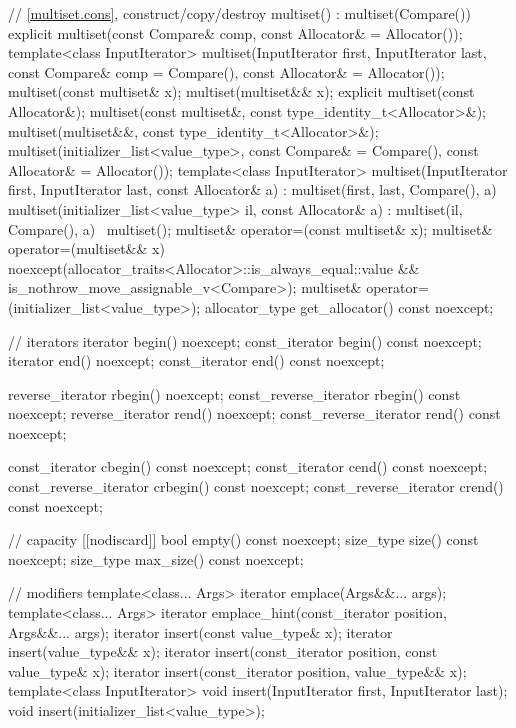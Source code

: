\begin{codeblock}
{{    // \ref{multiset.cons}, construct/copy/destroy
    multiset() : multiset(Compare()) { }
    explicit multiset(const Compare& comp, const Allocator& = Allocator());
    template<class InputIterator>
      multiset(InputIterator first, InputIterator last,
               const Compare& comp = Compare(), const Allocator& = Allocator());
    multiset(const multiset& x);
    multiset(multiset&& x);
    explicit multiset(const Allocator&);
    multiset(const multiset&, const type_identity_t<Allocator>&);
    multiset(multiset&&, const type_identity_t<Allocator>&);
    multiset(initializer_list<value_type>, const Compare& = Compare(),
             const Allocator& = Allocator());
    template<class InputIterator>
      multiset(InputIterator first, InputIterator last, const Allocator& a)
        : multiset(first, last, Compare(), a) { }
    multiset(initializer_list<value_type> il, const Allocator& a)
      : multiset(il, Compare(), a) { }
    ~multiset();
    multiset& operator=(const multiset& x);
    multiset& operator=(multiset&& x)
      noexcept(allocator_traits<Allocator>::is_always_equal::value &&
               is_nothrow_move_assignable_v<Compare>);
    multiset& operator=(initializer_list<value_type>);
    allocator_type get_allocator() const noexcept;

    // iterators
    iterator               begin() noexcept;
    const_iterator         begin() const noexcept;
    iterator               end() noexcept;
    const_iterator         end() const noexcept;

    reverse_iterator       rbegin() noexcept;
    const_reverse_iterator rbegin() const noexcept;
    reverse_iterator       rend() noexcept;
    const_reverse_iterator rend() const noexcept;

    const_iterator         cbegin() const noexcept;
    const_iterator         cend() const noexcept;
    const_reverse_iterator crbegin() const noexcept;
    const_reverse_iterator crend() const noexcept;

    // capacity
    [[nodiscard]] bool empty() const noexcept;
    size_type size() const noexcept;
    size_type max_size() const noexcept;

    // modifiers
    template<class... Args> iterator emplace(Args&&... args);
    template<class... Args> iterator emplace_hint(const_iterator position, Args&&... args);
    iterator insert(const value_type& x);
    iterator insert(value_type&& x);
    iterator insert(const_iterator position, const value_type& x);
    iterator insert(const_iterator position, value_type&& x);
    template<class InputIterator>
      void insert(InputIterator first, InputIterator last);
    void insert(initializer_list<value_type>);

}}
\end{codeblock}
